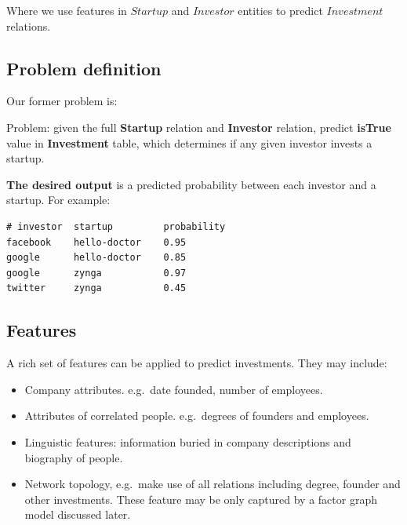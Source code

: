 Where we use features in \(Startup\) and \(Investor\) entities to
predict \(Investment\) relations.

\subsection{Problem definition}\label{problem-definition}

Our former problem is:

\begin{definition}\label{def:problem}

Problem: given the full \textbf{Startup} relation and
\textbf{Investor} relation, predict \textbf{isTrue} value in
\textbf{Investment} table, which determines if any given investor
invests a startup.

\end{definition}

\textbf{The desired output} is a predicted probability between each
investor and a startup. For example:

\small

\begin{verbatim}
# investor  startup         probability
facebook    hello-doctor    0.95
google      hello-doctor    0.85
google      zynga           0.97
twitter     zynga           0.45
\end{verbatim}

\normalsize

\subsection{Features}\label{features}

A rich set of features can be applied to predict investments. They may
include:

\begin{itemize}
\itemsep1pt\parskip0pt
\item
  Company attributes. e.g.~date founded, number of employees.
\item
  Attributes of correlated people. e.g.~degrees of founders and
  employees.
\item
  Linguistic features: information buried in company descriptions and
  biography of people.
\item
  Network topology, e.g.~make use of all relations including degree,
  founder and other investments. These feature may be only captured by a
  factor graph model discussed later.
\end{itemize}


